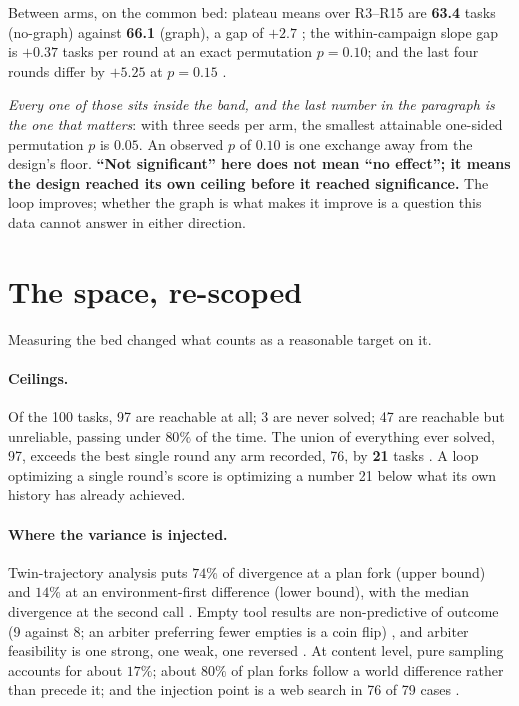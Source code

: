 Between arms, on the common bed: plateau means over R3--R15 are
\textbf{63.4} tasks (no-graph) against \textbf{66.1} (graph), a gap of
$+2.7$ ; the within-campaign slope gap is $+0.37$ tasks per round at
an exact permutation $p = 0.10$; and the last four rounds differ by $+5.25$
at $p = 0.15$ .

\emph{Every one of those sits inside the band, and the last number in the
paragraph is the one that matters}: with three seeds per arm, the smallest
attainable one-sided permutation $p$ is $0.05$. An observed $p$ of $0.10$
is one exchange away from the design's floor. \textbf{``Not significant''
here does not mean ``no effect''; it means the design reached its own
ceiling before it reached significance.} The loop improves; whether the
graph is what makes it improve is a question this data cannot answer in
either direction.

\section{The space, re-scoped}
\label{sec:respace}

Measuring the bed changed what counts as a reasonable target on it.

\paragraph{Ceilings.} Of the 100 tasks, 97 are reachable at all; 3 are
never solved; 47 are reachable but unreliable, passing under $80\%$ of the
time. The union of everything ever solved, 97, exceeds the best single
round any arm recorded, 76, by \textbf{21} tasks . A loop optimizing a single round's score is optimizing a
number 21 below what its own history has already achieved.

\paragraph{Where the variance is injected.} Twin-trajectory analysis puts
$74\%$ of divergence at a plan fork (upper bound) and $14\%$ at an
environment-first difference (lower bound), with the median divergence at
the second call . Empty tool results are non-predictive of outcome
(9 against 8; an arbiter preferring fewer empties is a coin flip) ,
and arbiter feasibility is one strong, one weak, one reversed . At
content level, pure sampling accounts for about $17\%$; about $80\%$ of
plan forks follow a world difference rather than precede it; and the
injection point is a web search in 76 of 79 cases .

